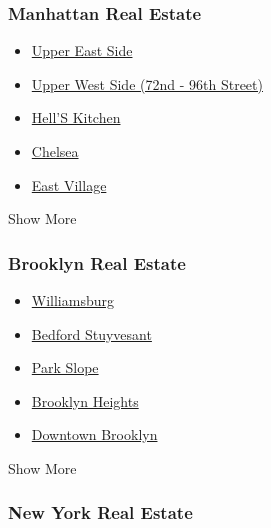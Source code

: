 \hypertarget{manhattan-real-estate}{%
\subsubsection{Manhattan Real Estate}\label{manhattan-real-estate}}

\begin{itemize}
\tightlist
\item
  \href{/real-estate/usa/ny/new-york/upper-east-side/homes-for-rent}{Upper
  East Side}
\item
  \href{/real-estate/usa/ny/new-york/upper-west-side-(72nd-96th-street)/homes-for-rent}{Upper
  West Side (72nd - 96th Street)}
\item
  \href{/real-estate/usa/ny/new-york/hell-s-kitchen/homes-for-rent}{Hell'S
  Kitchen}
\item
  \href{/real-estate/usa/ny/new-york/chelsea/homes-for-rent}{Chelsea}
\item
  \href{/real-estate/usa/ny/new-york/east-village/homes-for-rent}{East
  Village}
\end{itemize}

Show More

\hypertarget{brooklyn-real-estate}{%
\subsubsection{Brooklyn Real Estate}\label{brooklyn-real-estate}}

\begin{itemize}
\tightlist
\item
  \href{/real-estate/usa/ny/brooklyn/williamsburg/homes-for-rent}{Williamsburg}
\item
  \href{/real-estate/usa/ny/brooklyn/bedford-stuyvesant/homes-for-rent}{Bedford
  Stuyvesant}
\item
  \href{/real-estate/usa/ny/brooklyn/park-slope/homes-for-rent}{Park
  Slope}
\item
  \href{/real-estate/usa/ny/brooklyn/brooklyn-heights/homes-for-rent}{Brooklyn
  Heights}
\item
  \href{/real-estate/usa/ny/brooklyn/downtown-brooklyn/homes-for-rent}{Downtown
  Brooklyn}
\end{itemize}

Show More

\hypertarget{new-york-real-estate}{%
\subsubsection{New York Real Estate}\label{new-york-real-estate}}


